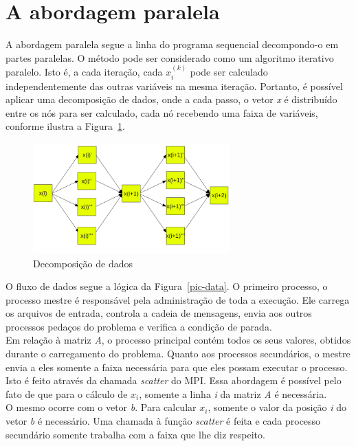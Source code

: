 \documentclass[a4paper]{article}
\begin{document}
\section{A abordagem paralela}
\indent \indent A abordagem paralela segue a linha do programa sequencial decompondo-o em partes paralelas. O método pode ser considerado como um algoritmo iterativo paralelo. Isto é, a cada iteração, cada \begin{math}x^{(k)}_i\end{math} pode ser calculado independentemente das outras variáveis na mesma iteração. Portanto, é possível aplicar uma decomposição de dados, onde a cada passo, o vetor \emph{x} é distribuído entre os nós para ser calculado, cada nó recebendo uma faixa de variáveis, conforme ilustra a Figura~\ref{pic-dec}.\\
\begin{figure}[float=h!]
	\centerline{\includegraphics[width=285px, height=161px]{dec}}
	\caption{Decomposição de dados}
	\label{pic-dec}
\end{figure}
\indent O fluxo de dados segue a lógica da Figura~\ref{pic-data}. O primeiro processo, o processo mestre é responsável pela administração de toda a execução. Ele carrega os arquivos de entrada, controla a cadeia de mensagens, envia aos outros processos pedaços do problema e verifica a condição de parada.\\
\indent Em relação à matriz \emph{A}, o processo principal contém todos os seus valores, obtidos durante o carregamento do problema. Quanto aos processos secundários, o mestre envia a eles somente a faixa necessária para que eles possam executar o processo. Isto é feito através da chamada \emph{scatter} do MPI. Essa abordagem é possível pelo fato de que para o cálculo de \begin{math}x_i\end{math}, somente a linha \emph{i} da matriz \emph{A} é necessária.\\
\indent O mesmo ocorre com o vetor \emph{b}. Para calcular \begin{math}x_i\end{math}, somente o valor da posição \emph{i} do vetor \emph{b} é necessário. Uma chamada à função \emph{scatter} é feita e cada processo secundário somente trabalha com a faixa que lhe diz respeito.\\
\end{document}
